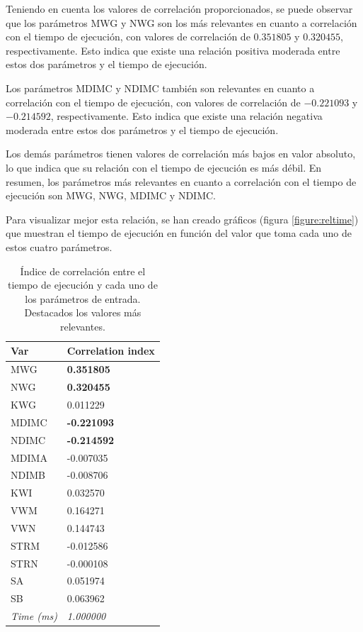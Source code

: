 Teniendo en cuenta los valores de correlación proporcionados, se puede observar que los parámetros MWG y NWG son los más relevantes en cuanto a correlación con el tiempo de ejecución, con valores de correlación de \(0.351805\) y \(0.320455\), respectivamente. Esto indica que existe una relación positiva moderada entre estos dos parámetros y el tiempo de ejecución.

Los parámetros MDIMC y NDIMC también son relevantes en cuanto a correlación con el tiempo de ejecución, con valores de correlación de \(-0.221093\) y \(-0.214592\), respectivamente. Esto indica que existe una relación negativa moderada entre estos dos parámetros y el tiempo de ejecución.

Los demás parámetros tienen valores de correlación más bajos en valor absoluto, lo que indica que su relación con el tiempo de ejecución es más débil. En resumen, los parámetros más relevantes en cuanto a correlación con el tiempo de ejecución son MWG, NWG, MDIMC y NDIMC.

Para visualizar mejor esta relación, se han creado gráficos (figura \ref{figure:reltime}) que muestran el tiempo de ejecución en función del valor que toma cada uno de estos cuatro parámetros.

\begin{table}[h]
    \centering
    \begin{tabular}{|l|l|}
    \hline
        \textbf{Var} & \textbf{Correlation index} \\ \hline
        MWG & \textbf{0.351805} \\ 
        NWG & \textbf{0.320455} \\ 
        KWG & 0.011229 \\ 
        MDIMC & \textbf{-0.221093} \\ 
        NDIMC & \textbf{-0.214592} \\ 
        MDIMA & -0.007035 \\ 
        NDIMB & -0.008706 \\ 
        KWI & 0.032570 \\ 
        VWM & 0.164271 \\ 
        VWN & 0.144743 \\ 
        STRM & -0.012586 \\ 
        STRN & -0.000108 \\ 
        SA & 0.051974 \\ 
        SB & 0.063962 \\ 
       \textit{Time (ms)} &\textit{1.000000} \\ \hline
    \end{tabular}
    \caption{\label{table:corr}Índice de correlación entre el tiempo de ejecución y cada uno de los parámetros de entrada. Destacados los valores más relevantes.}
\end{table}


